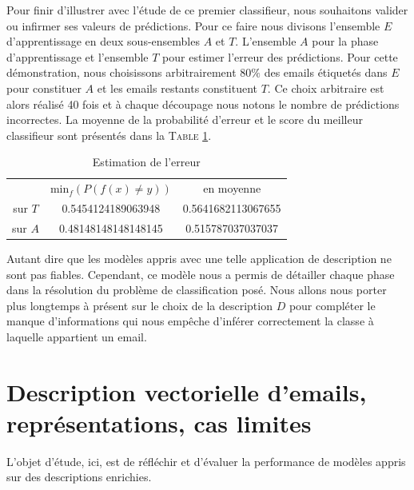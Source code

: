 \documentclass[a4paper, french]{article}
\begin{document}
Pour finir d'illustrer avec l'\'etude de ce premier classifieur, nous souhaitons
valider ou infirmer ses valeurs de pr\'edictions. Pour ce faire nous divisons
l'ensemble $E$ d'apprentissage en deux sous-ensembles $A$ et $T$.
L'ensemble $A$ pour la phase d'apprentissage et l'ensemble $T$ pour
estimer l'erreur des pr\'edictions. Pour cette d\'emonstration,
nous choisissons arbitrairement $80\%$ des emails \'etiquet\'es dans $E$
pour constituer $A$ et les emails restants constituent $T$. Ce choix arbitraire
est alors r\'ealis\'e 40 fois et \`a chaque d\'ecoupage nous notons le nombre
de pr\'edictions incorrectes. La moyenne de la probabilit\'e d'erreur et
le score du meilleur classifieur sont pr\'esent\'es dans la T\textsc{able}
\ref{tbl:erreur_exo2}.

\begin{table}[h]
\begin{center}
    \caption{Estimation de l'erreur}
    \label{tbl:erreur_exo2}
    \vskip 4mm
    \begin{tabular}{ccc}
        &min$_f(P(f(x)\neq y))$&en moyenne\\
        sur $T$&0.5454124189063948&0.5641682113067655\\
        sur $A$&0.48148148148148145&0.515787037037037
    \end{tabular}
\end{center}
\end{table}

Autant dire que les mod\`eles appris avec une telle application de description
ne sont pas fiables. Cependant, ce mod\`ele nous a permis de d\'etailler chaque
phase dans la r\'esolution du probl\`eme de classification pos\'e. Nous allons
nous porter plus longtemps \`a pr\'esent sur le choix de la description $D$
pour compl\'eter le manque d'informations qui nous emp\^eche
d'inf\'erer correctement la classe \`a laquelle appartient un email.


\section{Description vectorielle d'emails, repr\'esentations, cas limites}

L'objet d'\'etude, ici, est de r\'efl\'echir et d'\'evaluer la performance
de mod\`eles appris sur des descriptions enrichies.
\end{document}
